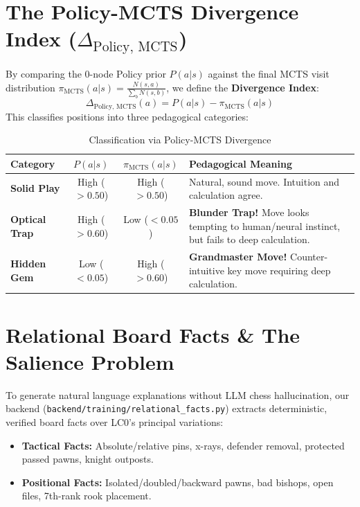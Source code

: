 \documentclass[11pt,a4paper]{report}
\begin{document}
\section{The Policy-MCTS Divergence Index ($\Delta_{\text{Policy, MCTS}}$)}
By comparing the 0-node Policy prior $P(a|s)$ against the final MCTS visit distribution $\pi_{\text{MCTS}}(a|s) = \frac{N(s,a)}{\sum_b N(s,b)}$, we define the \textbf{Divergence Index}:
\begin{equation}
\Delta_{\text{Policy, MCTS}}(a) = P(a|s) - \pi_{\text{MCTS}}(a|s)
\end{equation}
This classifies positions into three pedagogical categories:

\begin{table}[h!]
\centering
\begin{tabular}{|l|c|c|p{6cm}|}
\hline
\textbf{Category} & $P(a|s)$ & $\pi_{\text{MCTS}}(a|s)$ & \textbf{Pedagogical Meaning} \\ \hline
\textbf{Solid Play} & High ($>0.50$) & High ($>0.50$) & Natural, sound move. Intuition and calculation agree. \\ \hline
\textbf{Optical Trap} & High ($>0.60$) & Low ($<0.05$) & \textbf{Blunder Trap!} Move looks tempting to human/neural instinct, but fails to deep calculation. \\ \hline
\textbf{Hidden Gem} & Low ($<0.05$) & High ($>0.60$) & \textbf{Grandmaster Move!} Counter-intuitive key move requiring deep calculation. \\ \hline
\end{tabular}
\caption{Classification via Policy-MCTS Divergence}
\end{table}

\section{Relational Board Facts \& The Salience Problem}
To generate natural language explanations without LLM chess hallucination, our backend (\texttt{backend/training/relational\_facts.py}) extracts deterministic, verified board facts over LC0's principal variations:
\begin{itemize}
    \item \textbf{Tactical Facts:} Absolute/relative pins, x-rays, defender removal, protected passed pawns, knight outposts.
    \item \textbf{Positional Facts:} Isolated/doubled/backward pawns, bad bishops, open files, 7th-rank rook placement.
\end{itemize}
\end{document}
